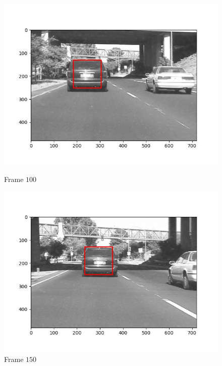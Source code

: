 \begin{figure}[H]
\begin{minipage}{.49\textwidth}
    \includegraphics[width=\textwidth]{./figures/lk/car1/frame000100.jpg}
    \caption{Frame $100$}
  \end{minipage}
  \begin{minipage}{.49\textwidth}
    \centering
    \includegraphics[width=\textwidth]{./figures/lk/car1/frame000150.jpg}
    \caption{Frame $150$}
  \end{minipage}
  \hfill
  \begin{minipage}{.49\textwidth}
    \centering

\end{minipage}
\end{figure}

